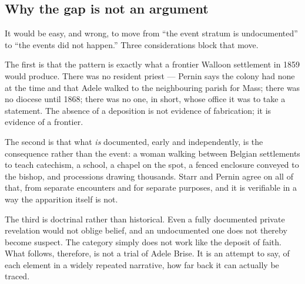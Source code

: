 \subsection{Why the gap is not an argument}

It would be easy, and wrong, to move from ``the event stratum is
undocumented'' to ``the events did not happen.'' Three considerations
block that move.

The first is that the pattern is exactly what a frontier Walloon
settlement in 1859 would produce. There was no resident priest ---
Pernin says the colony had none at the time and that Adele walked to
the neighbouring parish for Mass; there was no diocese until 1868; there was no
one, in short, whose office it was to take a statement. The absence of
a deposition is not evidence of fabrication; it is evidence of a
frontier.

The second is that what \emph{is} documented, early and independently,
is the consequence rather than the event: a woman walking between
Belgian settlements to teach catechism, a school, a chapel on the spot,
a fenced enclosure conveyed to the bishop, and processions drawing
thousands. Starr and Pernin agree on all of that, from separate
encounters and for separate purposes, and it is verifiable in a way the
apparition itself is not.

The third is doctrinal rather than historical. Even a fully documented
private revelation would not oblige belief, and an undocumented one
does not thereby become suspect. The category simply does not work like
the deposit of faith. What follows, therefore, is not a trial of Adele
Brise. It is an attempt to say, of each element in a widely repeated
narrative, how far back it can actually be traced.

